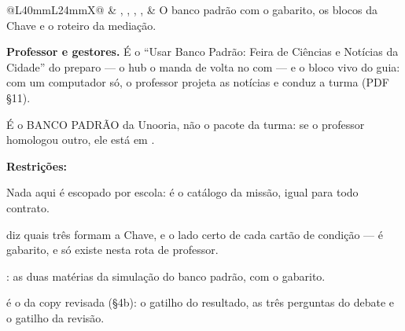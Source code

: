 \begin{tabularx}{\linewidth}{@{}L{40mm}L{24mm}X@{}}
\zebra {} & , , , ,  & O banco padrão com o gabarito, os blocos da Chave e o roteiro da mediação.\par \textbf{Professor e gestores.} É o \enquote{Usar Banco Padrão: Feira de Ciências e Notícias da Cidade} do preparo --- o hub o manda de volta no  com  --- e o bloco vivo do guia: com um computador só, o professor projeta as notícias e conduz a turma (PDF \S{}11).\par É o BANCO PADRÃO da Unooria, não o pacote da turma: se o professor homologou outro, ele está em .\par \textbf{Restrições:}\par \hspace*{1em}\textbullet{} Nada aqui é escopado por escola: é o catálogo da missão, igual para todo contrato.\par \hspace*{1em}\textbullet{}  diz quais três formam a Chave, e  o lado certo de cada cartão de condição --- é gabarito, e só existe nesta rota de professor.\par \hspace*{1em}\textbullet{} : as duas matérias da simulação do banco padrão, com o gabarito.\par \hspace*{1em}\textbullet{}  é o da copy revisada (\S{}4b): o gatilho do resultado, as três perguntas do debate e o gatilho da revisão.\\

\end{tabularx}
